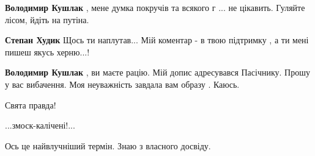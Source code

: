 \begin{itemize}
\begin{itemize}
 
\textbf{Володимир Кушлак} , мене думка покручів та всякого г ... не цікавить. Гуляйте лісом, йдіть на путіна.

 
\textbf{Степан Худик}
Щось ти наплутав...
Мій коментар - в твою підтримку , а ти мені пишеш якусь херню...!

 
\textbf{Володимир Кушлак} , ви маєте рацію. Мій допис адресувався Пасічнику. Прошу у вас вибачення. Моя неуважність завдала вам образу . Каюсь.
\end{itemize}

 
Свята правда!

 
...змоск-калічені!...

\begin{itemize}
 
Ось це найвлучніший термін. Знаю з власного досвіду.


\end{itemize}
\end{itemize}
